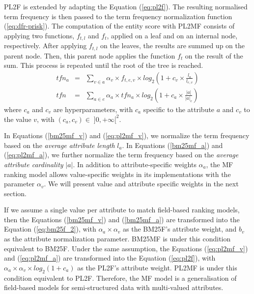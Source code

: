 PL2F is extended by adapting the Equation (\ref{eq:pl2f}). The resulting normalised term frequency is then passed to the term frequency normalization function (\ref{eq:dfr-prisk}).
The computation of the entity score with PL2MF consists of applying two functions, $f_{t,l}$ and $f_t$, applied on a leaf and on an internal node, respectively. After applying $f_{t,l}$ on the leaves, the results are summed up on the parent node. Then, this parent node applies the function $f_t$ on the result of the sum. This process is repeated until the root of the tree is reached.
\begin{eqnarray}
  \label{eq:pl2mf_v}
  tfn_a & = & \sum_{v\in a}{\alpha_v\times f_{t,e,v} \times log_2\left(1+c_v\times\frac{l_a}{l_{e,v}}\right)}\\
  \label{eq:pl2mf_a}
  tfn & = & \sum_{a\in e}{\alpha_a\times tfn_a \times log_2\left(1+c_a\times\frac{\left|{a}\right|}{\left|{a}\right|_e}\right)}
\end{eqnarray}
where $c_a$ and $c_v$ are hyperparameters, with $c_a$ specific to the attribute $a$ and $c_v$ to the value $v$, with $(c_a,c_v) \in\; ]0,+\infty[^2$.


In Equations (\ref{bm25mf_v}) and (\ref{eq:pl2mf_v}), we normalize the term frequency based on the \emph{average attribute length} $l_a$. In Equations (\ref{bm25mf_a}) and (\ref{eq:pl2mf_a}), we further normalize the term frequency based on the \emph{average attribute cardinality} $\left|{a}\right|$.
In addition to attribute-specific weights $\alpha_a$, the MF ranking model allows value-specific weights in its implementations with the parameter $\alpha_v$. We will present value and attribute specific weights in the next section.

If we assume a single value per attribute to match field-based ranking models, then the Equations (\ref{bm25mf_v}) and (\ref{bm25mf_a}) are transformed into the Equation (\ref{eq:bm25f_2}), with $\alpha_a\times\alpha_v$ as the BM25F's attribute weight, and $b_v$ as the attribute normalization parameter. BM25MF is under this condition equivalent to BM25F. Under the same assumption, the Equations (\ref{eq:pl2mf_v}) and (\ref{eq:pl2mf_a}) are transformed into the Equation (\ref{eq:pl2f}), with $\alpha_a\times\alpha_v\times log_2(1+c_a)$ as the PL2F's attribute weight. PL2MF is under this condition equivalent to PL2F. Therefore, the MF model is a generalisation of field-based models for semi-structured data with multi-valued attributes.
